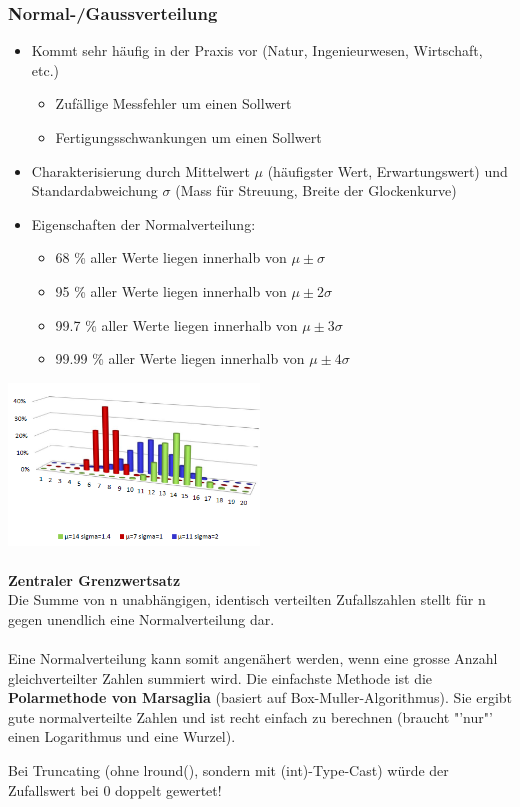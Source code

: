 \subsubsection{Normal-/Gaussverteilung}
\begin{itemize}
    \item Kommt sehr häufig in der Praxis vor (Natur, Ingenieurwesen, Wirtschaft, etc.)
        \begin{itemize}
            \item Zufällige Messfehler um einen Sollwert
            \item Fertigungsschwankungen um einen Sollwert
        \end{itemize}
    \item Charakterisierung durch Mittelwert $\mu$ (häufigster Wert, Erwartungswert) und Standardabweichung $\sigma$  (Mass für Streuung, Breite der Glockenkurve)
    \item Eigenschaften der Normalverteilung:
        \begin{itemize}
            \item 68 \% aller Werte liegen innerhalb von $\mu \pm \sigma$
            \item 95 \% aller Werte liegen innerhalb von $\mu \pm 2\sigma$
            \item 99.7 \% aller Werte liegen innerhalb von $\mu \pm 3\sigma$
            \item 99.99 \% aller Werte liegen innerhalb von $\mu \pm 4\sigma$
        \end{itemize}
    \end{itemize}
\includegraphics[width=0.5\textwidth]{images/Simulation/Normalverteilung.png}\\\\
\textbf{Zentraler Grenzwertsatz}\\
Die Summe von n unabhängigen, identisch verteilten Zufallszahlen stellt für n gegen unendlich eine Normalverteilung dar. \\\\ Eine Normalverteilung kann somit angenähert werden, wenn eine grosse Anzahl gleichverteilter Zahlen summiert wird. Die einfachste Methode ist die \textbf{Polarmethode von Marsaglia} (basiert auf Box-Muller-Algorithmus). Sie ergibt gute normalverteilte Zahlen und ist recht einfach zu berechnen (braucht "'nur"' einen Logarithmus und eine Wurzel).

Bei Truncating (ohne lround(), sondern mit (int)-Type-Cast) würde der Zufallswert bei 0 doppelt gewertet!

